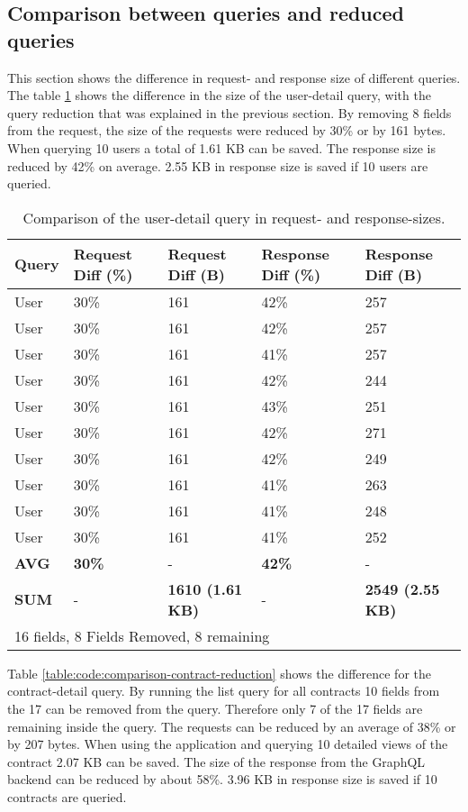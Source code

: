 
\subsection{Comparison between queries and reduced queries}

This section shows the difference in request- and response size of different queries. The table \ref{table:code:comparison-user-reduction} shows the difference in the size of the user-detail query, with the query reduction that was explained in the previous section. By removing 8 fields from the request, the size of the requests were reduced by 30\% or by 161 bytes. When querying 10 users a total of 1.61 KB can be saved. The response size is reduced by 42\% on average. 2.55 KB in response size is saved if 10 users are queried.

\ifshowTables
\begin{table}[H]
  \begin{tabular}{|l|l|l|l|l|}
  \hline
  Query & Request Diff (\%) & Request Diff (B) & Response Diff (\%) & Response Diff (B) \\
  \hline
  User & 30\% & 161 & 42\% & 257 \\
  \hline
  User & 30\% & 161 & 42\% & 257 \\
  \hline
  User & 30\% & 161 & 41\% & 257 \\
  \hline
  User & 30\% & 161 & 42\% & 244 \\
  \hline
  User & 30\% & 161 & 43\% & 251 \\
  \hline
  User & 30\% & 161 & 42\% & 271 \\
  \hline
  User & 30\% & 161 & 42\% & 249 \\
  \hline
  User & 30\% & 161 & 41\% & 263 \\
  \hline
  User & 30\% & 161 & 41\% & 248 \\
  \hline
  User & 30\% & 161 & 41\% & 252 \\
  \hline
  \hline
  \textbf{AVG} & \textbf{30\%} & - & \textbf{42\%} & -  \\
  \hline
  \textbf{SUM} & - & \textbf{1610 (1.61 KB)} & - & \textbf{2549 (2.55 KB)} \\
  \hline
  \multicolumn{5}{l}{16 fields, 8 Fields Removed, 8 remaining}
  \end{tabular}
  \caption{Comparison of the user-detail query in request- and response-sizes.}\label{table:code:comparison-user-reduction}
\end{table}
\fi

\noindent Table \ref{table:code:comparison-contract-reduction} shows the difference for the contract-detail query. By running the list query for all contracts 10 fields from the 17 can be removed from the query. Therefore only 7 of the 17 fields are remaining inside the query. The requests can be reduced by an average of 38\% or by 207 bytes. When using the application and querying 10 detailed views of the contract 2.07 KB can be saved. The size of the response from the GraphQL backend can be reduced by about 58\%. 3.96 KB in response size is saved if 10 contracts are queried.

